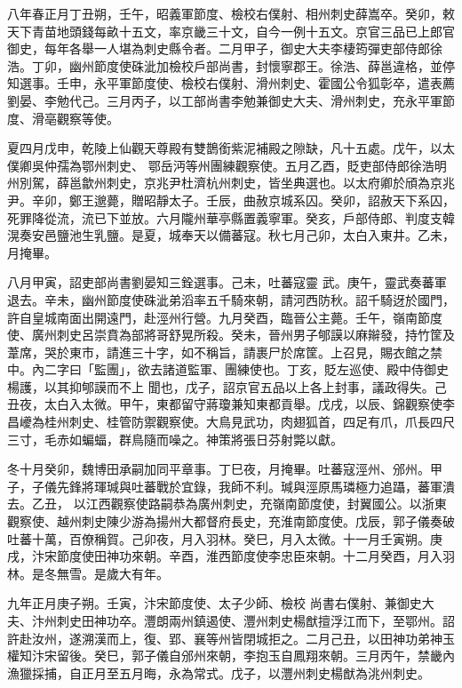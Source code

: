 \begin{pinyinscope}
 八年春正月丁丑朔，壬午，昭義軍節度、檢校右僕射、相州刺史薛嵩卒。癸卯，敕天下青苗地頭錢每畝十五文，率京畿三十文，自今一例十五文。京官三品已上郎官
 御史，每年各舉一人堪為刺史縣令者。二月甲子，御史大夫李棲筠彈吏部侍郎徐浩。丁卯，幽州節度使硃泚加檢校戶部尚書，封懷寧郡王。徐浩、薛邕違格，並停知選事。壬申，永平軍節度使、檢校右僕射、滑州刺史、霍國公令狐彰卒，遣表薦劉晏、李勉代己。三月丙子，以工部尚書李勉兼御史大夫、滑州刺史，充永平軍節度、滑亳觀察等使。



 夏四月戊申，乾陵上仙觀天尊殿有雙鵲銜紫泥補殿之隙缺，凡十五處。戊午，以太僕卿吳仲孺為鄂州刺史、
 鄂岳沔等州團練觀察使。五月乙酉，貶吏部侍郎徐浩明州別駕，薛邕歙州刺史，京兆尹杜濟杭州刺史，皆坐典選也。以太府卿於頎為京兆尹。辛卯，鄭王邈薨，贈昭靜太子。壬辰，曲赦京城系囚。癸卯，詔赦天下系囚，死罪降從流，流已下並放。六月隴州華亭縣置義寧軍。癸亥，戶部侍郎、判度支韓滉奏安邑鹽池生乳鹽。是夏，城奉天以備蕃寇。秋七月己卯，太白入東井。乙未，月掩畢。



 八月甲寅，詔吏部尚書劉晏知三銓選事。己未，吐蕃寇靈
 武。庚午，靈武奏蕃軍退去。辛未，幽州節度使硃泚弟滔率五千騎來朝，請河西防秋。詔千騎迓於國門，許自皇城南面出開遠門，赴涇州行營。九月癸酉，臨晉公主薨。壬午，嶺南節度使、廣州刺史呂崇賁為部將哥舒晃所殺。癸未，晉州男子郇謨以麻辮發，持竹筐及葦席，哭於東市，請進三十字，如不稱旨，請裹尸於席筐。上召見，賜衣館之禁中。內二字曰「監團」，欲去諸道監軍、團練使也。丁亥，貶左巡使、殿中侍御史楊護，以其抑郇謨而不上
 聞也，戊子，詔京官五品以上各上封事，議政得失。己丑夜，太白入太微。甲午，東都留守蔣瓊兼知東都貢舉。戊戌，以辰、錦觀察使李昌巙為桂州刺史、桂管防禦觀察使。大鳥見武功，肉翅狐首，四足有爪，爪長四尺三寸，毛赤如蝙蝠，群鳥隨而噪之。神策將張日芬射斃以獻。



 冬十月癸卯，魏博田承嗣加同平章事。丁巳夜，月掩畢。吐蕃寇涇州、邠州。甲子，子儀先鋒將琿瑊與吐蕃戰於宜錄，我師不利。瑊與涇原馬璘極力追躡，蕃軍潰去。乙丑，
 以江西觀察使路嗣恭為廣州刺史，充嶺南節度使，封翼國公。以浙東觀察使、越州刺史陳少游為揚州大都督府長史，充淮南節度使。戊辰，郭子儀奏破吐蕃十萬，百僚稱賀。己卯夜，月入羽林。癸巳，月入太微。十一月壬寅朔。庚戌，汴宋節度使田神功來朝。辛酉，淮西節度使李忠臣來朝。十二月癸酉，月入羽林。是冬無雪。是歲大有年。



 九年正月庚子朔。壬寅，汴宋節度使、太子少師、檢校
 尚書右僕射、兼御史大夫、汴州刺史田神功卒。灃朗兩州鎮遏使、灃州刺史楊猷擅浮江而下，至鄂州。詔許赴汝州，遂溯漢而上，復、郢、襄等州皆閉城拒之。二月己丑，以田神功弟神玉權知汴宋留後。癸巳，郭子儀自邠州來朝，李抱玉自鳳翔來朝。三月丙午，禁畿內漁獵採捕，自正月至五月晦，永為常式。戊子，以灃州刺史楊猷為洮州刺史。




\end{pinyinscope}
